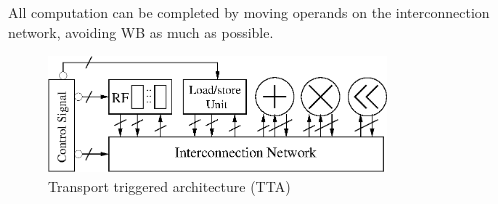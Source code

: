         All computation can be completed by moving operands on the interconnection network, avoiding WB as much as possible.
        \vspace{\textfig}
        \begin{figure}[!ht] 
            \centering
            \includegraphics[width=0.8\textwidth]{./figs/tta.eps}
            \caption{Transport triggered architecture (TTA)}
            \label{fig:tta}
        \end{figure}
      


